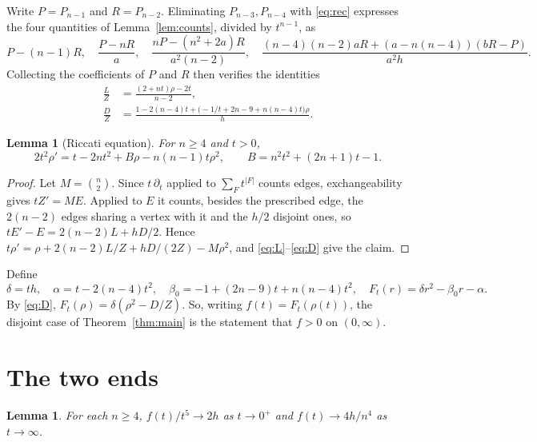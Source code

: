 \documentclass[11pt]{amsart}
\newtheorem{lemma}[theorem]{Lemma}
\theoremstyle{remark}
\begin{document}
Write $P=P_{n-1}$ and $R=P_{n-2}$. Eliminating $P_{n-3},P_{n-4}$ with \eqref{eq:rec}
expresses the four quantities of Lemma~\ref{lem:counts}, divided by $t^{n-1}$, as
\[
P-(n-1)R,\quad \frac{P-nR}{a},\quad \frac{nP-(n^2+2a)R}{a^2(n-2)},\quad
\frac{(n-4)(n-2)aR+(a-n(n-4))(bR-P)}{a^2h}.
\]
Collecting the coefficients of $P$ and $R$ then verifies the identities
\begin{align}
\frac LZ&=\frac{(2+nt)\rho-2t}{n-2},\label{eq:L}\\
\frac DZ&=\frac{1-2(n-4)t+\bigl(-1/t+2n-9+n(n-4)t\bigr)\rho}{h}.\label{eq:D}
\end{align}

\begin{lemma}[Riccati equation]\label{lem:ric}
For $n\ge4$ and $t>0$,
\[
2t^2\rho'=t-2nt^2+B\rho-n(n-1)t\rho^2,\qquad B=n^2t^2+(2n+1)t-1 .
\]
\end{lemma}

\begin{proof}
Let $M=\binom n2$. Since $t\,\partial_t$ applied to $\sum_Ft^{|F|}$ counts edges,
exchangeability gives $tZ'=ME$. Applied to $E$ it counts, besides the prescribed edge,
the $2(n-2)$ edges sharing a vertex with it and the $h/2$ disjoint ones, so
$tE'-E=2(n-2)L+hD/2$. Hence
$t\rho'=\rho+2(n-2)L/Z+hD/(2Z)-M\rho^2$, and \eqref{eq:L}--\eqref{eq:D} give the claim.
\end{proof}

Define
\[
\delta=th,\quad \alpha=t-2(n-4)t^2,\quad \beta_0=-1+(2n-9)t+n(n-4)t^2,\quad
F_t(r)=\delta r^2-\beta_0r-\alpha .
\]
By \eqref{eq:D}, $F_t(\rho)=\delta(\rho^2-D/Z)$. So, writing $f(t)=F_t(\rho(t))$, the
disjoint case of Theorem~\ref{thm:main} is the statement that $f>0$ on $(0,\infty)$.

\section{The two ends}\label{sec:ends}

\begin{lemma}\label{lem:ends}
For each $n\ge4$, $f(t)/t^5\to2h$ as $t\to0^+$ and $f(t)\to4h/n^4$ as $t\to\infty$.
\end{lemma}
\end{document}
